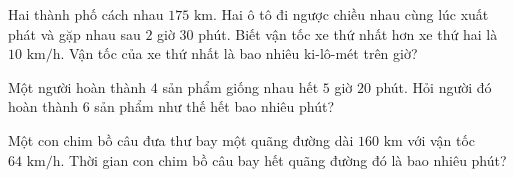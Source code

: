 \begin{ex} %
Hai thành phố cách nhau $175\text{ km}$. Hai ô tô đi ngược chiều nhau cùng lúc xuất phát và gặp nhau sau $2$ giờ $30$ phút. Biết vận tốc xe thứ nhất hơn xe thứ hai là $10\text{ km/h}$. Vận tốc của xe thứ nhất là bao nhiêu ki-lô-mét trên giờ?
\end{ex}

\begin{ex} %
Một người hoàn thành $4$ sản phẩm giống nhau hết $5$ giờ $20$ phút. Hỏi người đó hoàn thành $6$ sản phẩm như thế hết bao nhiêu phút?
\end{ex}

\begin{ex} %
Một con chim bồ câu đưa thư bay một quãng đường dài $160\text{ km}$ với vận tốc $64\text{ km/h}$. Thời gian con chim bồ câu bay hết quãng đường đó là bao nhiêu phút?
\end{ex}
